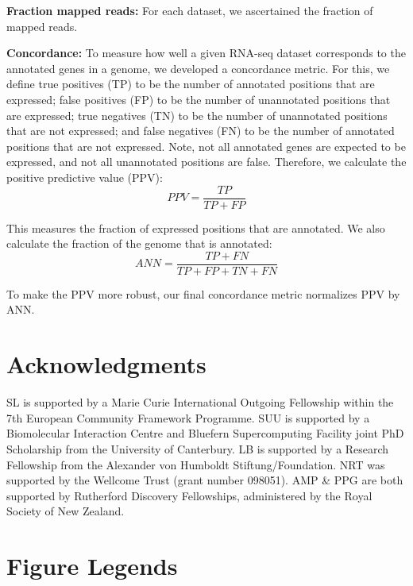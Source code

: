 \documentclass[10pt]{article}
\begin{document}
{\bf Fraction mapped reads:} For each dataset, we ascertained the
fraction of mapped reads.
	
{\bf Concordance:} To measure how well a given RNA-seq dataset
corresponds to the annotated genes in a genome, we developed a
concordance metric. For this, we define true positives (TP) to be the
number of annotated positions that are expressed; false positives (FP)
to be the number of unannotated positions that are expressed; true
negatives (TN) to be the number of unannotated positions that are not
expressed; and false negatives (FN) to be the number of annotated
positions that are not expressed. Note, not all annotated genes are
expected to be expressed, and not all unannotated positions are
false. Therefore, we calculate the positive predictive value (PPV):
\[
PPV=\frac{TP}{TP+FP}
\]
	
This measures the fraction of expressed positions that are
annotated. We also calculate the fraction of the genome that is
annotated:
\[
ANN=\frac{TP+FN}{TP+FP+TN+FN}
\]

To make the PPV more robust, our final concordance metric normalizes
PPV by ANN.

\section*{Acknowledgments}

SL is supported by a Marie Curie International Outgoing Fellowship
within the 7th European Community Framework Programme. SUU is
supported by a Biomolecular Interaction Centre and Bluefern
Supercomputing Facility joint PhD Scholarship from the University of
Canterbury. LB is supported by a Research Fellowship from the
Alexander von Humboldt Stiftung/Foundation. NRT was supported by the
Wellcome Trust (grant number 098051). AMP \& PPG are both supported by
Rutherford Discovery Fellowships, administered by the Royal Society of
New Zealand.



\newpage
\clearpage

\section*{Figure Legends}
\end{document}
